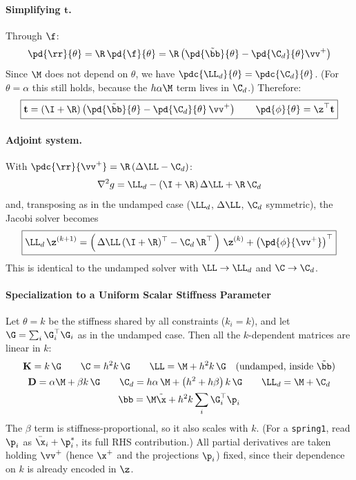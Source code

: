 \begin{derivation}
\paragraph{Simplifying $\mathbf{t}$.} Through $\f$:
\begin{equation*}
    \pd{\rr}{\theta} = \R\,\pd{\f}{\theta} = \R\left(\pd{\tilde\bb}{\theta} - \pd{\C_d}{\theta}\vv^+\right)
\end{equation*}
Since $\M$ does not depend on $\theta$, we have $\pdc{\LL_d}{\theta} = \pdc{\C_d}{\theta}$. (For $\theta = \alpha$ this still holds, because the $h\alpha\M$ term lives in $\C_d$.) Therefore:
\begin{equation}
    \boxed{
    \mathbf{t} = (\I + \R)\left(\pd{\tilde\bb}{\theta} - \pd{\C_d}{\theta}\,\vv^+\right)
    \qquad
    \pd{\phi}{\theta} = \z^\top\mathbf{t}
    }
\end{equation}

\paragraph{Adjoint system.} With $\pdc{\rr}{\vv^+} = \R\left(\Delta\LL - \C_d\right)$:
\begin{equation*}
    \nabla^2 g = \LL_d - (\I + \R)\,\Delta\LL + \R\,\C_d
\end{equation*}
and, transposing as in the undamped case ($\LL_d$, $\Delta\LL$, $\C_d$ symmetric), the Jacobi solver becomes
\begin{equation}
\boxed{
    \LL_d\,\z^{(k+1)} =
    \left(\,\Delta\LL\,(\I+\R)^\top - \C_d\,\R^\top\,\right)\,\z^{(k)} + \left(\pd{\phi}{\vv^+}\right)^\top
}
\end{equation}
This is identical to the undamped solver with $\LL \to \LL_d$ and $\C \to \C_d$.

\paragraph{Specialization to a Uniform Scalar Stiffness Parameter}
\mbox{}

\noindent Let $\theta = k$ be the stiffness shared by all constraints ($k_i = k$), and let $\G = \sum_i\G_i^\top\G_i$ as in the undamped case. Then all the $k$-dependent matrices are linear in $k$:
\begin{gather*}
    \mathbf{K} = k\,\G \qquad \C = h^2 k\,\G \qquad \LL = \M + h^2 k\,\G \quad (\text{undamped, inside } \tilde\bb)\\
    \mathbf{D} = \alpha\M + \beta k\,\G \qquad \C_d = h\alpha\,\M + \left(h^2 + h\beta\right)k\,\G \qquad \LL_d = \M + \C_d\\
    \bb = \M\tilde\x + h^2 k\sum_i\G_i^\top\p_i
\end{gather*}
The $\beta$ term is stiffness-proportional, so it also scales with $k$. (For a \texttt{spring1}, read $\p_i$ as $\bar\x_i + \p_i^*$, its full RHS contribution.)
\newline All partial derivatives are taken holding $\vv^+$ (hence $\x^+$ and the projections $\p_i$) fixed, since their dependence on $k$ is already encoded in $\z$.


\end{derivation}
